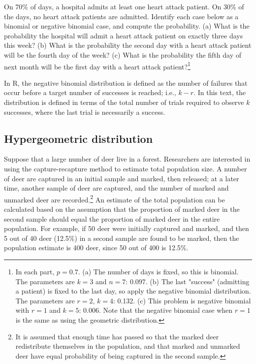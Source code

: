 \begin{exercise}
On 70\% of days, a hospital admits at least one heart attack patient. On 30\% of the days, no heart attack patients are admitted. Identify each case below as a binomial or negative binomial case, and compute the probability. (a) What is the probability the hospital will admit a heart attack patient on exactly three days this week? (b) What is the probability the second day with a heart attack patient will be the fourth day of the week? (c) What is the probability the fifth day of next month will be the first day with a heart attack patient?\footnote{In each part, $p=0.7$. (a) The number of days is fixed, so this is binomial. The parameters are $k=3$ and $n=7$: 0.097. (b) The last "success" (admitting a patient) is fixed to the last day, so apply the negative binomial distribution. The parameters are $r=2$, $k=4$: 0.132. (c) This problem is negative binomial with $r=1$ and $k=5$: 0.006. Note that the negative binomial case when $r=1$ is the same as using the geometric distribution.}
\end{exercise}

In \textsf{R}, the negative binomial distribution is defined as the number of failures that occur before a target number of successes is reached; i.e., $k - r$. In this text, the distribution is defined in terms of the total number of trials required to observe $k$ successes, where the last trial is necessarily a success. 



\subsection{Hypergeometric distribution}
\label{hypergeometric}


Suppose that a large number of deer live in a forest. Researchers are interested in using the capture-recapture method to estimate total population size. A number of deer are captured in an initial sample and marked, then released; at a later time, another sample of deer are captured, and the number of marked and unmarked deer are recorded.\footnote{It is assumed that enough time has passed so that the marked deer redistribute themselves in the population, and that marked and unmarked deer have equal probability of being captured in the second sample.} An estimate of the total population can be calculated based on the assumption that the proportion of marked deer in the second sample should equal the proportion of marked deer in the entire population. For example, if 50 deer were initially captured and marked, and then 5 out of 40 deer (12.5\%) in a second sample are found to be marked, then the population estimate is 400 deer, since 50 out of 400 is 12.5\%.

